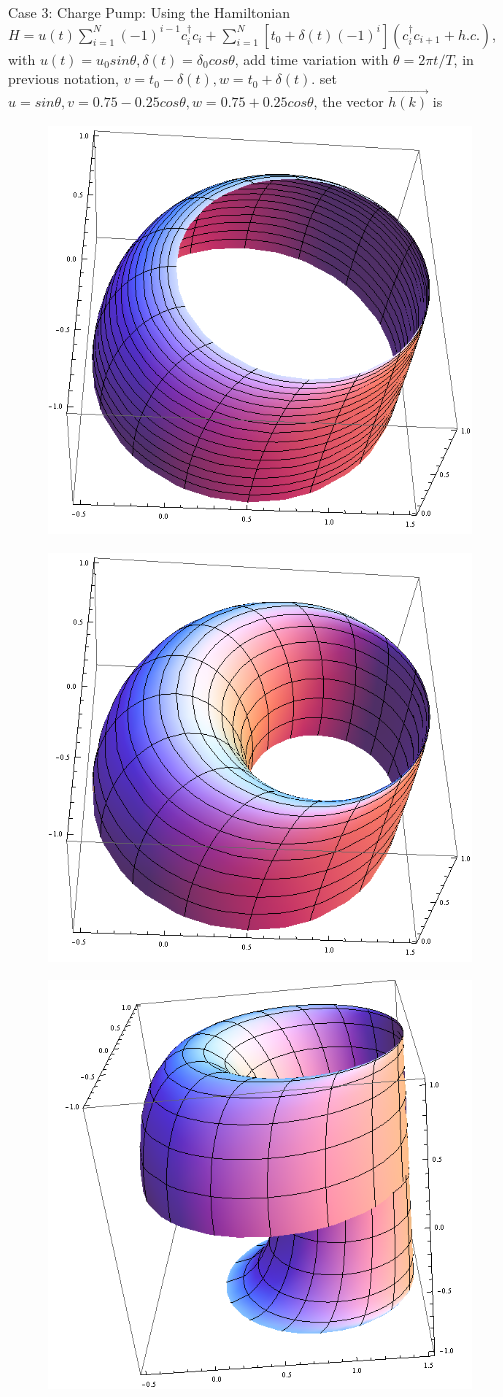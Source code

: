\documentclass[letterpaper,10pt,english]{sphinxmanual}
\begin{document}
Case 3: Charge Pump: Using the Hamiltonian
\(H=u(t)\sum\limits_{i=1}^N(-1)^{i-1}c_i^{\dagger}c_i+\sum\limits_{i=1}^N[t_0+\delta(t)(-1)^i](c_i^{\dagger}c_{i+1}+h.c.)\),
with \(u(t)=u_0 sin\theta, \delta(t)=\delta_0 cos\theta\), add time
variation with \(\theta=2\pi t/T\), in previous notation,
\(v=t_0-\delta(t), w=t_0+\delta(t)\). set
\(u=sin\theta, v=0.75-0.25cos\theta, w=0.75+0.25cos\theta\), the
vector \(\vec{h(k)}\) is
\begin{figure}[htbp]
\centering

\includegraphics[width=0.500\linewidth]{5a.png}
\end{figure}
\begin{figure}[htbp]
\centering

\includegraphics[width=0.500\linewidth]{5b.png}
\end{figure}
\begin{figure}[htbp]
\centering

\includegraphics[width=0.500\linewidth]{5c.png}
\end{figure}
\end{document}

